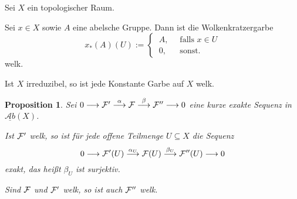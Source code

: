 \documentclass[11pt]{book}
\newtheorem{proposition}[theorem]{Proposition}
\theoremstyle{nonumberbreak}
\newenvironment{ex}[1][]{\ifthenelse{\equal{#1}{}}{\example}{\example[#1]}\rm}{\endexample}
\newcommand{\AbX}{\underline{\mathcal{A}b}(X)}
\begin{document}
\begin{spacing}{1.4}
\begin{ex} %
Sei $X$ ein topologischer Raum.
\begin{compactenum}
\item Sei $x \in X$ sowie $A$ eine abelsche Gruppe. Dann ist die Wolkenkratzergarbe
$$x_*(A)(U):= \begin{cases} \ A, & \ \textrm{ falls } x \in U \\ \ 0, & \ \textrm{ sonst. } \end{cases}$$
welk.
\item Ist $X$ irreduzibel, so ist jede Konstante Garbe auf $X$ welk.
\end{compactenum}
\end{ex}


\begin{proposition}
Sei $0 \longrightarrow \mathcal{F}' \overset{\alpha}{\longrightarrow} \mathcal{F} \overset{\beta}{\longrightarrow} \mathcal{F}'' \longrightarrow 0$ eine kurze exakte Sequenz in $\AbX$.
\begin{compactenum}
\item Ist $\mathcal{F}'$ welk, so ist für jede offene Teilmenge $U \subseteq X$ die Sequenz
$$0 \longrightarrow \mathcal{F}'(U) \overset{\alpha_U}{\longrightarrow} \mathcal{F}(U) \overset{\beta_U}{\longrightarrow} \mathcal{F}''(U) \longrightarrow 0$$
exakt, das heißt $\beta_U$ ist surjektiv.
\item Sind $\mathcal{F}$ und $\mathcal{F}'$ welk, so ist auch $\mathcal{F}''$ welk.

\end{compactenum}


\end{proposition}
\end{spacing}
\end{document}
